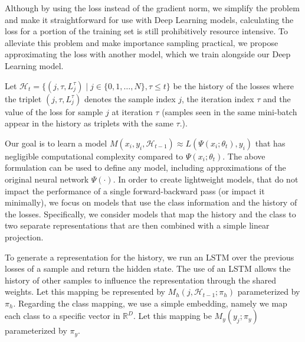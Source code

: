 \documentclass{article}
\begin{document}
Although by using the loss instead of the gradient norm, we
simplify the problem and make it straightforward for use with Deep Learning
models, calculating the loss for a portion of the training set is still
prohibitively resource intensive. To alleviate this problem and make importance
sampling practical, we propose approximating the loss
with another model, which we train alongside our Deep Learning model.

Let $\mathcal{H}_t = \{(j, \tau, L_j^{\tau}) \mid j \in \{0, 1, \dots, N\},
\tau \leq t\}$ be the history of the losses where the triplet $(j, \tau,
L_j^{\tau})$ denotes the sample index $j$, the iteration index $\tau$ and the
value of the loss for sample $j$ at iteration $\tau$ (samples seen in the same
mini-batch appear in the history as triplets with the same $\tau$.).

Our goal is to learn a
model $M(x_i, y_i, \mathcal{H}_{t-1}) \approx L(\Psi(x_i; \theta_t), y_i)$ that
has negligible computational complexity compared to $\Psi(x_i; \theta_t)$. The
above formulation can be used to define any model, including approximations of
the original neural network $\Psi(\cdot)$. In order to create lightweight
models, that do not impact the performance of a single forward-backward pass (or
impact it minimally), we focus on models that use the class information and the
history of the losses. Specifically, we consider models that map the history
and the class to two separate representations that are then combined with a
simple linear projection.

To generate a representation for the history, we run an LSTM over the previous
losses of a sample and return the hidden state. The use of an LSTM allows the
history of other samples to influence the representation through the shared
weights. Let this mapping be represented by $M_h(j, \mathcal{H}_{t-1}; \pi_h)$
parameterized by $\pi_h$. Regarding the class mapping, we use a simple
embedding, namely we map each class to a specific vector in $\mathbb{R}^D$. Let
this mapping be $M_y(y_j; \pi_y)$  parameterized by $\pi_y$.
\end{document}
